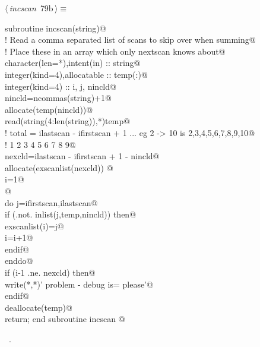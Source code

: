 \documentclass[10pt,a4paper,notitlepage]{article}
\begin{document}
\begin{flushleft} \small
\begin{minipage}{\linewidth}\label{scrap89}\raggedright\small
{} $\langle\,${\it incscan}\nobreak\ {\footnotesize {79b}}$\,\rangle\equiv$
\vspace{-1ex}
\begin{list}{}{} \item
\mbox{}\verb@      subroutine incscan(string)@\\
\mbox{}\verb@! Read a comma separated list of scans to skip over when summing@\\
\mbox{}\verb@! Place these in an array which only nextscan knows about@\\
\mbox{}\verb@      character(len=*),intent(in) :: string@\\
\mbox{}\verb@      integer(kind=4),allocatable :: temp(:)@\\
\mbox{}\verb@      integer(kind=4) :: i, j, nincld@\\
\mbox{}\verb@      nincld=ncommas(string)+1@\\
\mbox{}\verb@      allocate(temp(nincld))@\\
\mbox{}\verb@      read(string(4:len(string)),*)temp@\\
\mbox{}\verb@! total = ilastscan - ifirstscan + 1   ... eg 2 -> 10 is 2,3,4,5,6,7,8,9,10@\\
\mbox{}\verb@!                                                        1 2 3 4 5 6 7 8 9@\\
\mbox{}\verb@      nexcld=ilastscan - ifirstscan + 1 - nincld@\\
\mbox{}\verb@      allocate(exscanlist(nexcld)) @\\
\mbox{}\verb@      i=1@\\
\mbox{}\verb@      @\\
\mbox{}\verb@      do j=ifirstscan,ilastscan@\\
\mbox{}\verb@         if (.not. inlist(j,temp,nincld)) then@\\
\mbox{}\verb@           exscanlist(i)=j@\\
\mbox{}\verb@           i=i+1@\\
\mbox{}\verb@         endif@\\
\mbox{}\verb@      enddo@\\
\mbox{}\verb@      if (i-1 .ne. nexcld) then@\\
\mbox{}\verb@         write(*,*)' problem - debug is= please'@\\
\mbox{}\verb@      endif@\\
\mbox{}\verb@      deallocate(temp)@\\
\mbox{}\verb@      return;  end subroutine incscan                                      @{\NWsep}
\end{list}
\vspace{-1.5ex}
\footnotesize
\begin{list}{}{\setlength{\itemsep}{-\parsep}\setlength{\itemindent}{-\leftmargin}}
\item \NWtxtMacroRefIn\ .


\end{list}
\end{minipage}
\end{flushleft}
\end{document}
